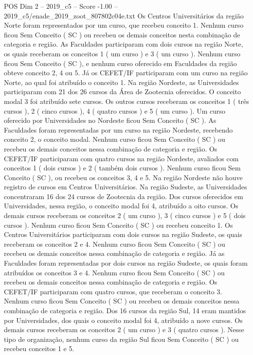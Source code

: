 \begin{textsample}{POS Dim 2 – 2019\_c5 – Score -1.00 – 2019\_c5/enade\_2019\_zoot\_807802c04e.txt}
Os Centros Universitários da região Norte foram representados por um curso, que recebeu conceito 1.
Nenhum curso ficou Sem Conceito ( SC ) ou recebeu os demais conceitos nesta combinação de categoria e região.
As Faculdades participaram com dois cursos na região Norte, os quais receberam os conceitos 1 ( um curso ) e 3 ( um curso ).
Nenhum curso ficou Sem Conceito ( SC ), e nenhum curso oferecido em Faculdades da região obteve conceito 2, 4 ou 5.
Já os CEFET/IF participaram com um curso na região Norte, ao qual foi atribuído o conceito 1.
Na região Nordeste, as Universidades participaram com 21 dos 26 cursos da Área de Zootecnia oferecidos.
O conceito modal 3 foi atribuído sete cursos.
Os outros cursos receberam os conceitos 1 ( três cursos ), 2 ( cinco cursos ), 4 ( quatro cursos ) e 5 ( um curso ).
Um curso oferecido por Universidades no Nordeste ficou Sem Conceito ( SC ).
As Faculdades foram representadas por um curso na região Nordeste, recebendo conceito 2, o conceito modal.
Nenhum curso ficou Sem Conceito ( SC ) ou recebeu os demais conceitos nessa combinação de categoria e região.
Os CEFET/IF participaram com quatro cursos na região Nordeste, avaliados com conceitos 1 ( dois cursos ) e 2 ( também dois cursos ).
Nenhum curso ficou Sem Conceito ( SC ), ou recebeu os conceitos 3, 4 e 5.
Na região Nordeste não houve registro de cursos em Centros Universitários.
Na região Sudeste, as Universidades concentraram 16 dos 24 cursos de Zootecnia da região.
Dos cursos oferecidos em Universidades, nessa região, o conceito modal foi 4, atribuído a oito cursos.
Os demais cursos receberam os conceitos 2 ( um curso ), 3 ( cinco cursos ) e 5 ( dois cursos ).
Nenhum curso ficou Sem Conceito ( SC ) ou recebeu conceito 1.
Os Centros Universitários participaram com dois cursos na região Sudeste, os quais receberam os conceitos 2 e 4.
Nenhum curso ficou Sem Conceito ( SC ) ou recebeu os demais conceitos nessa combinação de categoria e região.
Já as Faculdades foram representadas por dois cursos na região Sudeste, os quais foram atribuídos os conceitos 3 e 4.
Nenhum curso ficou Sem Conceito ( SC ) ou recebeu os demais conceitos nessa combinação de categoria e região.
Os CEFET/IF participaram com quatro cursos, que receberam o conceito 3.
Nenhum curso ficou Sem Conceito ( SC ) ou recebeu os demais conceitos nessa combinação de categoria e região.
Dos 16 cursos da região Sul, 14 eram mantidos por Universidades, dos quais o conceito modal foi 4, atribuído a nove cursos.
Os demais cursos receberam os conceitos 2 ( um curso ) e 3 ( quatro cursos ).
Nesse tipo de organização, nenhum curso da região Sul ficou Sem Conceito ( SC ) ou recebeu conceitos 1 e 5.

\end{textsample}
